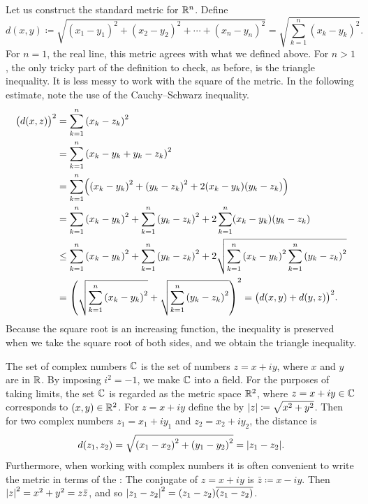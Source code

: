 \begin{example}
Let us construct the
standard metric for ${\mathbb{R}}^n$.  Define
\begin{equation*}
d(x,y) \coloneqq
\sqrt{
{(x_1-y_1)}^2 + 
{(x_2-y_2)}^2 + 
\cdots +
{(x_n-y_n)}^2
} =
\sqrt{
\sum_{k=1}^n
{(x_k-y_k)}^2 
} .
\end{equation*}
For $n=1$, the real line, this metric agrees with what we defined above.
For $n > 1$,
the only tricky part of the definition to check, as before, is the triangle inequality.
It is less messy to work with the square of the metric.  In the
following estimate, note the use of the Cauchy--Schwarz inequality.
\begin{equation*}
\begin{split}
{\bigl(d(x,z)\bigr)}^2 & =
\sum_{k=1}^n
{(x_k-z_k)}^2 
\\
& =
\sum_{k=1}^n
{(x_k-y_k+y_k-z_k)}^2 
\\
& =
\sum_{k=1}^n
\Bigl(
{(x_k-y_k)}^2+{(y_k-z_k)}^2 + 2(x_k-y_k)(y_k-z_k)
\Bigr)
\\
& =
\sum_{k=1}^n
{(x_k-y_k)}^2
+
\sum_{k=1}^n
{(y_k-z_k)}^2 
+
2
\sum_{k=1}^n
(x_k-y_k)(y_k-z_k)
\\
& \leq
\sum_{k=1}^n
{(x_k-y_k)}^2
+
\sum_{k=1}^n
{(y_k-z_k)}^2 
+
2
\sqrt{
\sum_{k=1}^n
{(x_k-y_k)}^2
\sum_{k=1}^n
{(y_k-z_k)}^2
}
\\
& =
{\left(
\sqrt{
\sum_{k=1}^n
{(x_k-y_k)}^2
}
+
\sqrt{
\sum_{k=1}^n
{(y_k-z_k)}^2 
}
\right)}^2
=
{\bigl( d(x,y) + d(y,z) \bigr)}^2 .
\end{split}
\end{equation*}
Because the square root is an increasing function, the
inequality is preserved when we 
take the square root of both sides, and we obtain the triangle inequality.
\end{example}

\begin{example}
The set of complex numbers ${\mathbb{C}}$ is the set of numbers $z = x+iy$, where $x$
and $y$ are in ${\mathbb{R}}$.  By imposing $i^2 = -1$, we make ${\mathbb{C}}$ into a
field.
For the purposes of taking limits,
the set ${\mathbb{C}}$ is regarded as the metric space ${\mathbb{R}}^2$, where $z=x+iy \in {\mathbb{C}}$
corresponds to $(x,y) \in {\mathbb{R}}^2$.
For $z=x+iy$ define the \emph{}
by $\lvert {z} \rvert \coloneqq \sqrt{x^2+y^2}$.
Then for two complex numbers
$z_1 = x_1 + iy_1$ and $z_2 = x_2 + iy_2$, the distance is
\begin{equation*}
d(z_1,z_2) = \sqrt{{(x_1-x_2)}^2+ {(y_1-y_2)}^2} = \lvert {z_1-z_2} \rvert.
\end{equation*}
Furthermore, when working with complex numbers
it is often convenient to write the metric in terms of
the
\emph{}: The conjugate of $z=x+iy$
is $\bar{z} \coloneqq x-iy$.  Then 
${\lvert {z} \rvert}^2 = x^2 +y^2 = z\bar{z}$, and so ${\lvert {z_1-z_2} \rvert}^2 =
(z_1-z_2)\overline{(z_1-z_2)}$.
\end{example}

